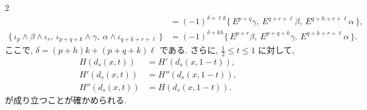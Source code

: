 \documentclass[10pt, leqno]{ltjsarticle}
\newcommand{\toda}[1]{\{\,#1\,\}}              %
\numberwithin{equation}{section}
\theoremstyle{plain}
\theoremstyle{definition}
\theoremstyle{remark}
\begin{document}
\begin{paracol}{2}
\[\begin{aligned}
& = (-1)^{\delta+ \ell k}\toda{E^{p+q}\gamma,\ E^{q+r+\ell}\beta,\ E^{q+h+r+\ell}\alpha},\\
\toda{\iota_p\wedge\beta\wedge\iota_r,\ \iota_{p+q+k}\wedge\gamma,\ \alpha\wedge\iota_{q+k+r+\ell}}
& = (-1)^{\delta+kh}\toda{E^{p+r}\beta,\ E^{p+q+k}\gamma,\ E^{q+k+r+\ell}\alpha}.
\end{aligned}
\]
ここで, $\delta=(p+h)k+(p+q+k)\ell$ である.
さらに, \(\frac{1}{2}\le t\le 1\) に対して, 
\[
\begin{align*}
H(d_s(x,t)) &= H'(d_s(x,1-t)),\\
H'(d_s(x,t)) & = H''(d_s(x,1-t)),\\
H''(d_s(x,t)) & = H(d_s(x,1-t)).
\end{align*}
\]
が成り立つことが確かめられる.

\switchcolumn

\end{paracol}
\end{document}
